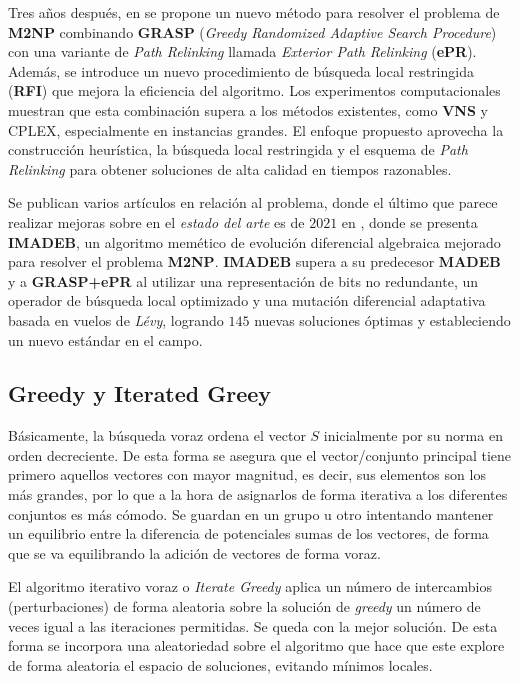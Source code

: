 \documentclass[12pt,letterpaper]{article}
\begin{document}
Tres años después, en \cite{RODRIGUEZ2017243} se propone un nuevo método para resolver el problema de \textbf{M2NP} combinando \textbf{GRASP} (\textit{Greedy Randomized Adaptive Search Procedure}) con una variante de \textit{Path Relinking} llamada  \textit{Exterior Path Relinking} (\textbf{ePR}). Además, se introduce un nuevo procedimiento de búsqueda local restringida (\textbf{RFI}) que mejora la eficiencia del algoritmo. Los experimentos computacionales muestran que esta combinación supera a los métodos existentes, como \textbf{VNS} y CPLEX, especialmente en instancias grandes. El enfoque propuesto aprovecha la construcción heurística, la búsqueda local restringida y el esquema de \textit{Path Relinking} para obtener soluciones de alta calidad en tiempos razonables.

Se publican varios artículos en relación al problema, donde el último que parece realizar mejoras sobre en el \textit{estado del arte} es de $2021$ en \cite{SANTUCCI2021114938}, donde se presenta \textbf{IMADEB}, un algoritmo memético de evolución diferencial algebraica mejorado para resolver el problema \textbf{M2NP}. \textbf{IMADEB} supera a su predecesor \textbf{MADEB} y a \textbf{GRASP+ePR} al utilizar una representación de bits no redundante, un operador de búsqueda local optimizado y una mutación diferencial adaptativa basada en vuelos de \textit{Lévy}, logrando $145$ nuevas soluciones óptimas y estableciendo un nuevo estándar en el campo.

\subsection{Greedy y Iterated Greey}

Básicamente, la búsqueda voraz ordena el vector $S$ inicialmente por su norma en orden decreciente. De esta forma se asegura que el vector/conjunto principal tiene primero aquellos vectores con mayor magnitud, es decir, sus elementos son los más grandes, por lo que a la hora de asignarlos de forma iterativa a los diferentes conjuntos es más cómodo. Se guardan en un grupo u otro intentando mantener un equilibrio entre la diferencia de potenciales sumas de los vectores, de forma que se va equilibrando la adición de vectores de forma voraz.

El algoritmo iterativo voraz o \textit{Iterate Greedy} aplica un número de intercambios (perturbaciones) de forma aleatoria sobre la solución de \textit{greedy} un número de veces igual a las iteraciones permitidas. Se queda con la mejor solución. De esta forma se incorpora una aleatoriedad sobre el algoritmo que hace que este explore de forma aleatoria el espacio de soluciones, evitando mínimos locales.
\end{document}
